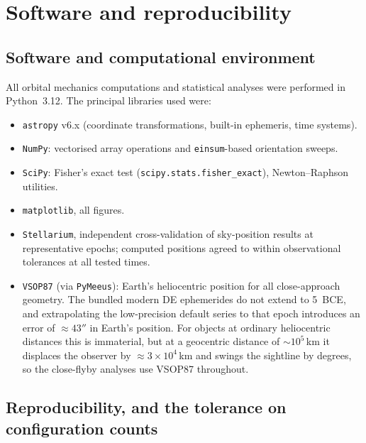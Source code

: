 \documentclass[11pt,a4paper]{article}
\begin{document}
\section*{Software and reproducibility}
\subsection{Software and computational environment}\label{subsec:software}

All orbital mechanics computations and statistical analyses were performed
in Python~3.12. The principal libraries used were:

\begin{itemize}
  \item \texttt{astropy} v6.x\cite{astropy2022} (coordinate
    transformations, built-in ephemeris, time systems).
  \item \texttt{NumPy}\cite{harris2020}: vectorised array operations
    and \texttt{einsum}-based orientation sweeps.
  \item \texttt{SciPy}\cite{virtanen2020}: Fisher's exact test
    (\texttt{scipy.stats.fisher\_exact}), Newton--Raphson utilities.
  \item \texttt{matplotlib}\cite{hunter2007}, all figures.
  \item \texttt{Stellarium}\cite{stellarium2021}, independent cross-validation
    of sky-position results at representative epochs; computed positions
    agreed to within observational tolerances at all tested times.
  \item \texttt{VSOP87} (via \texttt{PyMeeus}): Earth's heliocentric position
    for all close-approach geometry.  The bundled modern DE ephemerides do not
    extend to 5~BCE, and extrapolating the low-precision default series to that
    epoch introduces an error of ${\approx}43''$ in Earth's position.  For
    objects at ordinary heliocentric distances this is immaterial, but at a
    geocentric distance of ${\sim}10^{5}$\,km it displaces the observer by
    ${\approx}3\times10^{4}$\,km and swings the sightline by degrees, so the
    close-flyby analyses use VSOP87 throughout.
\end{itemize}

\subsection{Reproducibility, and the tolerance on configuration counts}
\label{subsec:reproducibility}
\end{document}
